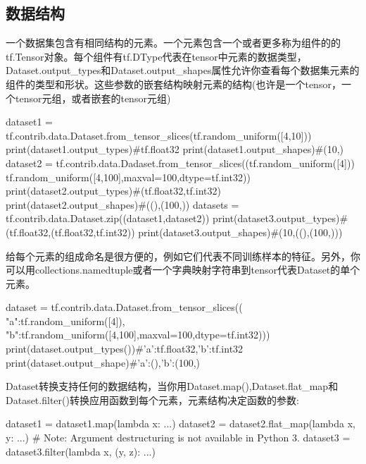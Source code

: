 \subsection{数据结构}
一个数据集包含有相同结构的元素。一个元素包含一个或者更多称为组件的的tf.Tensor对象。每个组件有tf.DType代表在tensor中元素的数据类型，Dataset.output\_types和Dataset.output\_shapes属性允许你查看每个数据集元素的组件的类型和形状。这些参数的嵌套结构映射元素的结构(也许是一个tensor，一个tensor元组，或者嵌套的tensor元组)
\begin{python}
dataset1 = tf.contrib.data.Dataset.from_tensor_slices(tf.random_uniform([4,10]))
print(dataset1.output_types)#tf.float32
print(dataset1.output_shapes)#(10,)
dataset2 = tf.contrib.data.Dadaset.from_tensor_slices((tf.random_uniform([4]))
tf.random_uniform([4,100],maxval=100,dtype=tf.int32))
print(dataset2.output_types)#(tf.float32,tf.int32)
print(dataset2.output_shapes)#((),(100,))
datasets = tf.contrib.data.Dataset.zip((dataset1,dataset2))
print(dataset3.output_types)#(tf.float32,(tf.float32,tf.int32))
print(dataset3.output_shapes)#(10,((),(100,)))
\end{python}
给每个元素的组成命名是很方便的，例如它们代表不同训练样本的特征。另外，你可以用collections.namedtuple或者一个字典映射字符串到tensor代表Dataset的单个元素。
\begin{python}
dataset = tf.contrib.data.Dataset.from_tensor_slices((
	"a":tf.random_uniform([4]),
	"b":tf.random_uniform([4,100],maxval=100,dtype=tf.int32)))
print(dataset.output_types())#{'a':tf.float32,'b':tf.int32}
print(dataset.output_shape)#{'a':(),'b':(100,)}
\end{python}
Dataset转换支持任何的数据结构，当你用Dataset.map(),Dataset.flat\_map和Dataset.filter()转换应用函数到每个元素，元素结构决定函数的参数:
\begin{python}
dataset1 = dataset1.map(lambda x: ...)
dataset2 = dataset2.flat_map(lambda x, y: ...)
# Note: Argument destructuring is not available in Python 3.
dataset3 = dataset3.filter(lambda x, (y, z): ...)
\end{python}
